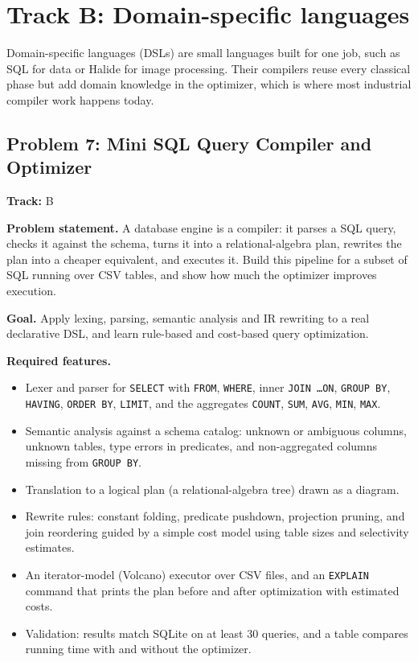 \documentclass[11pt,a4paper]{article}
\newcommand{\fld}[1]{\par\smallskip\textbf{\color{accent}#1}\quad}
\newcommand{\meta}[1]{%
  \begin{tcolorbox}[colback=softbg,colframe=softbg,boxsep=2pt,left=4pt,right=4pt,top=2pt,bottom=2pt,arc=2pt]
  \small\textbf{Track:} #1
  \end{tcolorbox}}
\begin{document}
\section{Track B: Domain-specific languages}

Domain-specific languages (DSLs) are small languages built for one job, such as SQL for data or
Halide for image processing. Their compilers reuse every classical phase but add domain knowledge in
the optimizer, which is where most industrial compiler work happens today.

\subsection{Problem 7: Mini SQL Query Compiler and Optimizer}
\meta{B}

\fld{Problem statement.} A database engine is a compiler: it parses a SQL query, checks it against
the schema, turns it into a relational-algebra plan, rewrites the plan into a cheaper equivalent, and
executes it. Build this pipeline for a subset of SQL running over CSV tables, and show how much the
optimizer improves execution.

\fld{Goal.} Apply lexing, parsing, semantic analysis and IR rewriting to a real declarative DSL,
and learn rule-based and cost-based query optimization.

\fld{Required features.}
\begin{itemize}
  \item Lexer and parser for \texttt{SELECT} with \texttt{FROM}, \texttt{WHERE}, inner \texttt{JOIN \ldots ON},
  \texttt{GROUP BY}, \texttt{HAVING}, \texttt{ORDER BY}, \texttt{LIMIT}, and the aggregates
  \texttt{COUNT}, \texttt{SUM}, \texttt{AVG}, \texttt{MIN}, \texttt{MAX}.
  \item Semantic analysis against a schema catalog: unknown or ambiguous columns, unknown tables, type
  errors in predicates, and non-aggregated columns missing from \texttt{GROUP BY}.
  \item Translation to a logical plan (a relational-algebra tree) drawn as a diagram.
  \item Rewrite rules: constant folding, predicate pushdown, projection pruning, and join reordering
  guided by a simple cost model using table sizes and selectivity estimates.
  \item An iterator-model (Volcano) executor over CSV files, and an \texttt{EXPLAIN} command that prints
  the plan before and after optimization with estimated costs.
  \item Validation: results match SQLite on at least 30 queries, and a table compares running time with and without the optimizer.
\end{itemize}
\end{document}
